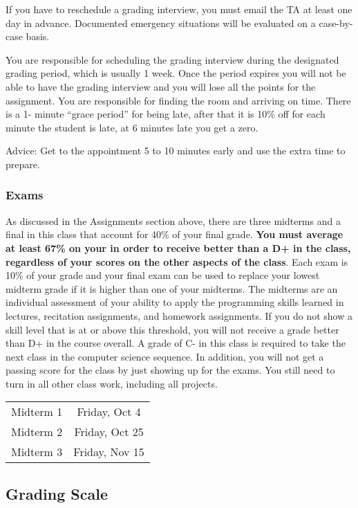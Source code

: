 If you have to reschedule a grading interview, you must email the TA at least one day in advance. Documented emergency situations will be evaluated on a case-by-case basis.

You are responsible for scheduling the grading interview during the designated grading period, which is usually 1 week. Once the period expires you will not be able to have the grading interview and you will lose all the points for the assignment. You are responsible for finding the room and arriving on time. There is a 1- minute “grace period” for being late, after that it is 10\% off for each minute the student is late, at 6 minutes late you get a zero.

Advice: Get to the appointment 5 to 10 minutes early and use the extra time to prepare. 

\subsubsection{Exams}

As discussed in the Assignments section above, there are three midterms and a final in this class that account for 40\% of your final grade. \textbf{You must average at least 67\% on your in order to receive better than a D+ in the class, regardless of your scores on the other aspects of the class}. Each exam is 10\% of your grade and your final exam can be used to replace your lowest midterm grade if it is higher than one of your midterms. The midterms are an individual assessment of your ability to apply the programming skills learned in lectures, recitation assignments, and homework assignments. If you do not show a skill level that is at or above this threshold, you will not receive a grade better than D+ in the course overall. A grade of C- in this class is required to take the next class in the computer science sequence. In addition, you will not get a passing score for the class by just showing up for the exams. You still need to turn in all other class work, including all projects. 

\begin{table}[H]
    \centering
    \begin{tabular}{c|c}
        Midterm 1 & Friday, Oct 4\\
        Midterm 2 & Friday, Oct 25 \\
        Midterm 3 & Friday, Nov 15
    \end{tabular}
\end{table}

\subsection{Grading Scale}

